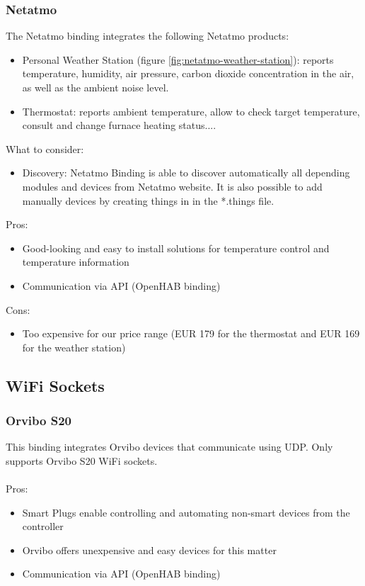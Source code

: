 \subsubsection{Netatmo}
The Netatmo binding integrates the following Netatmo products:
\begin{itemize}
	\item Personal Weather Station (figure \ref{fig:netatmo-weather-station}): reports temperature, humidity, air pressure, carbon 
	dioxide concentration in the air, as well as the ambient noise level.
	\item Thermostat: reports ambient temperature, allow to check target temperature, consult and change furnace heating status....
\end{itemize}
What to consider:
\begin{itemize}
	\item Discovery: Netatmo Binding is able to discover automatically all depending modules and devices from Netatmo website. It is 
	also possible to add manually devices by creating things in in the *.things file.
\end{itemize}
Pros:
\begin{itemize}
	\item Good-looking and easy to install solutions for temperature control and temperature information
	\item Communication via API (OpenHAB binding)
\end{itemize}
Cons:
\begin{itemize}
	\item Too expensive for our price range (EUR 179 for the thermostat and EUR 169 for the weather station)
\end{itemize}

\subsection{WiFi Sockets}

\subsubsection{Orvibo S20}
This binding integrates Orvibo devices that communicate using UDP. Only supports Orvibo S20 WiFi sockets.\\~\\
Pros:
\begin{itemize}
	\item Smart Plugs enable controlling and automating non-smart devices from the controller
	\item Orvibo offers unexpensive and easy devices for this matter
	\item Communication via API (OpenHAB binding)
\end{itemize}


